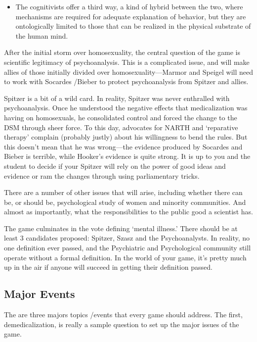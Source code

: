 \begin{refsection}
\begin{itemize}
\item The cognitivists offer a third way, a kind of hybrid between the two, where mechanisms are required for adequate explanation of behavior, but they are ontologically limited to those that can be realized in the physical substrate of the human mind.

\end{itemize}

After the initial storm over homosexuality, the central question of the game is scientific legitimacy of psychoanalysis. This is a complicated issue, and will make allies of those initially divided over homosexuality---Marmor and Speigel will need to work with Socardes \slash  Bieber to protect psychoanalysis from Spitzer and allies.

Spitzer is a bit of a wild card. In reality, Spitzer was never enthralled with psychoanalysis. Once he understood the negative effects that medicalization was having on homosexuals, he consolidated control and forced the change to the DSM through sheer force. To this day, advocates for NARTH and `reparative therapy' complain (probably justly) about his willingness to bend the rules. But this doesn't mean that he was wrong---the evidence produced by Socardes and Bieber is terrible, while Hooker's evidence is quite strong. It is up to you and the student to decide if your Spitzer will rely on the power of good ideas and evidence or ram the changes through using parliamentary tricks.

There are a number of other issues that will arise, including whether there can be, or should be, psychological study of women and minority communities. And almost as importantly, what the responsibilities to the public good a scientist has.

The game culminates in the vote defining `mental illness.' There should be at least 3 candidates proposed: Spitzer, Szasz and the Psychoanalysts. In reality, no one definition ever passed, and the Psychiatric and Psychological community still operate without a formal definition. In the world of your game, it's pretty much up in the air if anyone will succeed in getting their definition passed.

\subsection{Major Events}
\label{majorevents}

The are three majors topics \slash  events that every game should address. The first, demedicalization, is really a sample question to set up the major issues of the game.


\end{refsection}
